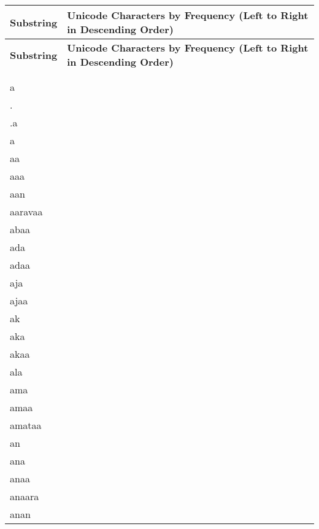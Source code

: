 \documentclass{article}
\begin{document}
\begin{longtable}{|l|p{}|}
\hline
\textbf{Substring} & \textbf{Unicode Characters by Frequency (Left to Right in Descending Order)} \\
\hline
\endfirsthead %
\hline
\textbf{Substring} & \textbf{Unicode Characters by Frequency (Left to Right in Descending Order)} \\
\hline
\endhead %
\hline
\endfoot
\hline
\endlastfoot
 & \textIndus{        } \\
  & \textIndus{} \\
 a & \textIndus{} \\
. & \textIndus{   } \\
.a & \textIndus{} \\
a & \textIndus{                                               } \\
aa & \textIndus{                                                   } \\
aaa & \textIndus{         } \\
aan & \textIndus{} \\
aaravaa & \textIndus{} \\
abaa & \textIndus{} \\
ada & \textIndus{ } \\
adaa & \textIndus{} \\
aja & \textIndus{} \\
ajaa & \textIndus{ } \\
ak & \textIndus{} \\
aka & \textIndus{  } \\
akaa & \textIndus{} \\
ala & \textIndus{} \\
ama & \textIndus{      } \\
amaa & \textIndus{     } \\
amataa & \textIndus{ } \\
an & \textIndus{                           } \\
ana & \textIndus{} \\
anaa & \textIndus{     } \\
anaara & \textIndus{} \\
anan & \textIndus{ } \\

\end{longtable}
\end{document}
